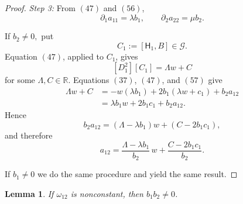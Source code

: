 \documentclass[11pt,a4paper]{article}
\numberwithin{equation}{section}
\theoremstyle{journalplain}
\newtheorem{lemma}[theorem]{Lemma}
\theoremstyle{journaldef}
\begin{document}
\begin{tcolorbox}[
  enhanced,
  breakable,
  title={Proof of Theorem~\ref{prop:G-parallel}}
]
\begin{proof}
\emph{Step 3:} From \((47)\) and \((56)\),
\[
\partial_1a_{11}=\lambda b_1,
\qquad
\partial_2a_{22}=\mu b_2.
\tag{57}
\]

If
\(
b_2\ne0,
\)
put
\[
C_1:=[\mathsf H_1,B]\in\mathcal G.
\tag{59}
\]
Equation \((47)\), applied to \(C_1\), gives
\[
[D_1^2][C_1]=\Lambda w+C
\tag{60}
\]
for some \(\Lambda,C\in\mathbb R\). Equations \((37)\), \((47)\), and
\((57)\) give
\[
\begin{aligned}
\Lambda w+C
&=
-w(\lambda b_1)
+2b_1(\lambda w+c_1)
+b_2a_{12}\\
&=
\lambda b_1w+2b_1c_1+b_2a_{12}.
\end{aligned}
\tag{61}
\]
Hence
\[
b_2a_{12}
=
(\Lambda-\lambda b_1)w
+
(C-2b_1c_1),
\tag{62}
\]
and therefore
\[
a_{12}
=
\frac{\Lambda-\lambda b_1}{b_2}\,w
+
\frac{C-2b_1c_1}{b_2}.
\tag{63}
\]


If
\(
b_1 \neq 0
\)
we do the same procedure and yield the same result.
\end{proof}
\end{tcolorbox}





\begin{lemma}\label{lem:b-both}
If $\omega_{12}$ is nonconstant, then $b_1b_2\ne 0$.
\end{lemma}
\end{document}
